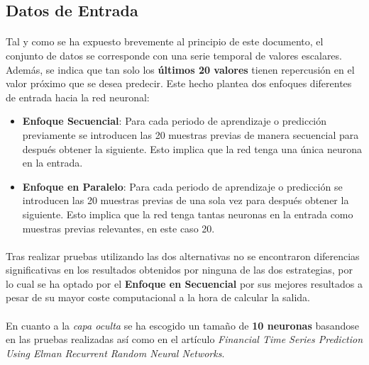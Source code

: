 \documentclass[10pt, a4paper,spanish]{article}
\begin{document}
		\subsection{Datos de Entrada}

			\paragraph{}
			Tal y como se ha expuesto brevemente al principio de este documento, el conjunto de datos se corresponde con una serie temporal de valores escalares. Además, se indica que tan solo los \textbf{últimos 20 valores} tienen repercusión en el valor próximo que se desea predecir. Este hecho plantea dos enfoques diferentes de entrada hacia la red neuronal:

 			\begin{itemize}
 				\item \textbf{Enfoque Secuencial}: Para cada periodo de aprendizaje o predicción previamente se introducen las 20 muestras previas de manera secuencial para después obtener la siguiente. Esto implica que la red tenga una única neurona en la entrada.

				\item \textbf{Enfoque en Paralelo}: Para cada periodo de aprendizaje o predicción se introducen las 20 muestras previas de una sola vez para después obtener la siguiente. Esto implica que la red tenga tantas neuronas en la entrada como muestras previas relevantes, en este caso 20.
 			\end{itemize}

			\paragraph{}
			Tras realizar pruebas utilizando las dos alternativas no se encontraron diferencias significativas en los resultados obtenidos por ninguna de las dos estrategias, por lo cual se ha optado por el \textbf{Enfoque en Secuencial} por sus mejores resultados a pesar de su mayor coste computacional a la hora de calcular la salida.

			\paragraph{}
			En cuanto a la \emph{capa oculta} se ha escogido un tamaño de \textbf{10 neuronas} basandose en las pruebas realizadas así como en el artículo \emph{Financial Time Series Prediction Using Elman Recurrent Random Neural Networks}\cite{financial:article}.
\end{document}
